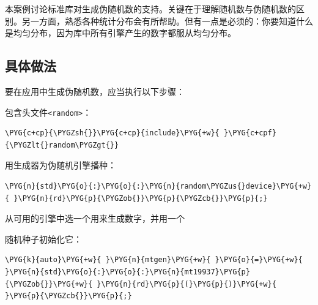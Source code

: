本案例讨论标准库对生成伪随机数的支持。关键在于理解随机数与伪随机数的区别。另一方面，熟悉各种统计分布会有所帮助。但有一点是必须的：你要知道什么是均匀分布，因为库中所有引擎产生的数字都服从均匀分布。



\subsection{具体做法}



要在应用中生成伪随机数，应当执行以下步骤：



包含头文件\texttt{<\allowbreak{}random>}：



\begin{codeblockbg}
\begin{Verbatim}[commandchars=\\\{\},breaklines=true,breakanywhere=true,fontsize=\codefont,xleftmargin=17bp]
\PYG{c+cp}{\PYGZsh{}}\PYG{c+cp}{include}\PYG{+w}{ }\PYG{c+cpf}{\PYGZlt{}random\PYGZgt{}}
\end{Verbatim}
\end{codeblockbg}



用生成器为伪随机引擎播种：



\begin{codeblockbg}
\begin{Verbatim}[commandchars=\\\{\},breaklines=true,breakanywhere=true,fontsize=\codefont,xleftmargin=17bp]
\PYG{n}{std}\PYG{o}{:}\PYG{o}{:}\PYG{n}{random\PYGZus{}device}\PYG{+w}{ }\PYG{n}{rd}\PYG{p}{\PYGZob{}}\PYG{p}{\PYGZcb{}}\PYG{p}{;}
\end{Verbatim}
\end{codeblockbg}



从可用的引擎中选一个用来生成数字，并用一个



随机种子初始化它：



\begin{codeblockbg}
\begin{Verbatim}[commandchars=\\\{\},breaklines=true,breakanywhere=true,fontsize=\codefont,xleftmargin=17bp]
\PYG{k}{auto}\PYG{+w}{ }\PYG{n}{mtgen}\PYG{+w}{ }\PYG{o}{=}\PYG{+w}{ }\PYG{n}{std}\PYG{o}{:}\PYG{o}{:}\PYG{n}{mt19937}\PYG{p}{\PYGZob{}}\PYG{+w}{ }\PYG{n}{rd}\PYG{p}{(}\PYG{p}{)}\PYG{+w}{ }\PYG{p}{\PYGZcb{}}\PYG{p}{;}
\end{Verbatim}
\end{codeblockbg}


